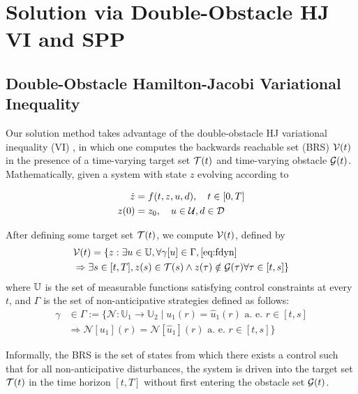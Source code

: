 \section{Solution via Double-Obstacle HJ VI and SPP\label{sec:solution}}
\subsection{Double-Obstacle Hamilton-Jacobi Variational Inequality}
Our solution method takes advantage of the double-obstacle HJ variational inequality (VI) \cite{Fisac15}, in which one computes the backwards reachable set (BRS) $\mathcal{V}(t)$ in the presence of a time-varying target set $\mathcal{T}(t)$ and time-varying obstacle $\mathcal{G}(t)$. Mathematically, given a system with state $z$ evolving according to

\begin{equation}
\label{eq:fdyn} %
\begin{aligned}
\dot{z} &= f(t, z, u, d), \quad t \in [0, T] \\
z(0) &= z_0, \quad u \in \cset, d \in \dset
\end{aligned}
\end{equation}

After defining some target set $\mathcal{T}(t)$, we compute $\mathcal{V}(t)$, defined by 
%
\begin{equation}
\label{eq:brs}
\begin{aligned}
&\mathcal{V}(t) = \{z: \exists u \in \mathbb{U}, \forall \gamma[u] \in \Gamma, \eqref{eq:fdyn} \\
&\Rightarrow \exists s \in [t, T], z(s) \in \mathcal{T}(s) \wedge z(\tau) \notin \mathcal{G}(\tau) \forall \tau \in [t, s]\}
\end{aligned}
\end{equation}
%
\noindent where $\mathbb{U}$ is the set of measurable functions satisfying control constraints at every $t$, and $\Gamma$ is the set of non-anticipative strategies \cite{Mitchell05} defined as follows:
\begin{equation}
\begin{aligned}
\gamma &\in \Gamma := \{\mathcal{N}: \mathbb{U}_1 \rightarrow \mathbb{U}_2 \mid  u_1(r) = \hat{u}_1(r) \text{ a. e. } r\in[t,s] \\
& \Rightarrow \mathcal{N}[u_1](r) = \mathcal{N}[\hat{u}_1](r) \text{ a. e. } r\in[t,s]\}
\end{aligned}
\end{equation}

Informally, the BRS is the set of states from which there exists a control such that for all non-anticipative disturbances, the system is driven into the target set $\mathcal{T}(t)$ in the time horizon $[t, T]$ without first entering the obstacle set $\mathcal{G}(t)$.


